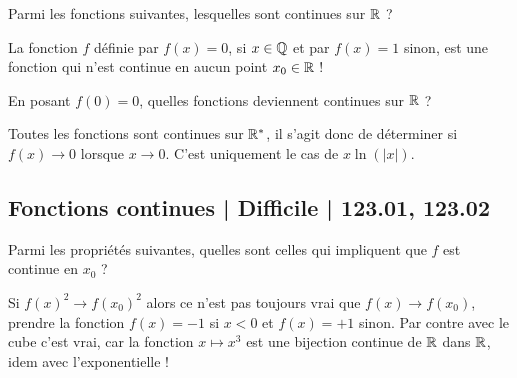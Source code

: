 \begin{question}
Parmi les fonctions suivantes, lesquelles sont continues sur $\mathbb{R}$ ?
\begin{answers}



   
\end{answers}
\begin{explanations}
La fonction $f$ définie par $f(x) = 0$, si $x\in \mathbb{Q}$ et par $f(x)=1$ sinon, est une fonction qui n'est continue en aucun point $x_0\in \mathbb{R}$ !
\end{explanations}
\end{question}


\begin{question}
En posant $f(0)=0$, quelles fonctions deviennent continues sur $\mathbb{R}$ ?
\begin{answers}



\end{answers}
\begin{explanations}
Toutes les fonctions sont  continues sur $\mathbb{R}^*$, il s'agit donc de déterminer si $f(x) \to 0$ lorsque $x\to0$. C'est uniquement le cas de $x \ln( |x|)$.
\end{explanations}
\end{question}




\subsection{Fonctions continues | Difficile | 123.01, 123.02}


\begin{question}
Parmi les propriétés suivantes, quelles sont celles qui impliquent que $f$ est continue en $x_ 0$ ?
\begin{answers}



\end{answers}
\begin{explanations}
Si $f(x)^2 \to f(x_0)^2$  alors ce n'est pas toujours vrai que $f(x) \to f(x_0)$, prendre la fonction $f(x)=-1$ si $x<0$ et $f(x)=+1$ sinon. Par contre avec le cube c'est vrai, car la fonction $x \mapsto x^3$ est une bijection continue de $\mathbb{R}$ dans $\mathbb{R}$, idem avec l'exponentielle !
\end{explanations}
\end{question}


